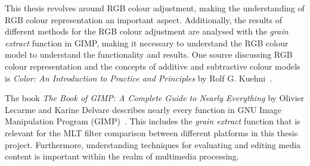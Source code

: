 \documentclass[../MasterThesis.tex]{subfiles}
\begin{document}
	
	\begin{description}[font=\color{RedViolet!80!black}, style=nextline]
		
		\item[RGB representation] 
		
		This thesis revolves around RGB colour adjustment, making the understanding of RGB colour representation an important aspect. Additionally, the results of different methods for the RGB colour adjustment are analysed with the \textit{grain extract} function in GIMP, making it necessary to understand the RGB colour model to understand the functionality and results.
		One source discussing RGB colour representation and the concepts of additive and subtractive colour models is \textit{Color: An Introduction to Practice and Principles} by Rolf G. Kuehni~\cite{colourRGB}. 
		
		
		
		
				
		
		\item[GIMP]
		
		
		The book \textit{The Book of GIMP: A Complete Guide to Nearly Everything} by Olivier Lecarme and Karine Delvare describes nearly every function in GNU Image Manipulation Program (GIMP)~\cite{gimp}.
		This includes the \textit{grain extract} function that is relevant for the MLT filter comparison between different platforms in this thesis project.
		Furthermore, understanding techniques for evaluating and editing media content is important within the realm of multimedia processing.
		
		
		
		
		
		\item[Colour grading] 
		

\end{description}
\end{document}
